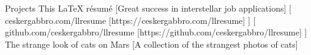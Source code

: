 \documentclass[
]{llresume}
\begin{document}
\begin{mainpane}
    \begin{mainsection}
        {Projects} %
                \entryGeneric
                {This LaTeX résumé} %
                [Great success in interstellar job applications] %
                    [
                        \infoGeneric
                        {\faGlobe}%
                        {ceskergabbro.com/llresume}%
                        [https://ceskergabbro.com/llresume] %
                    ]
                    [
                        \infoGeneric
                        {\faGithub}%
                        {github.com/ceskergabbro/llresume}%
                        [https://github.com/ceskergabbro/llresume] %
                    ]
                \entryGeneric
                {The strange look of cats on Mars} %
                [A collection of the strangest photos of cats] %

\end{mainsection}
\end{mainpane}
\end{document}
